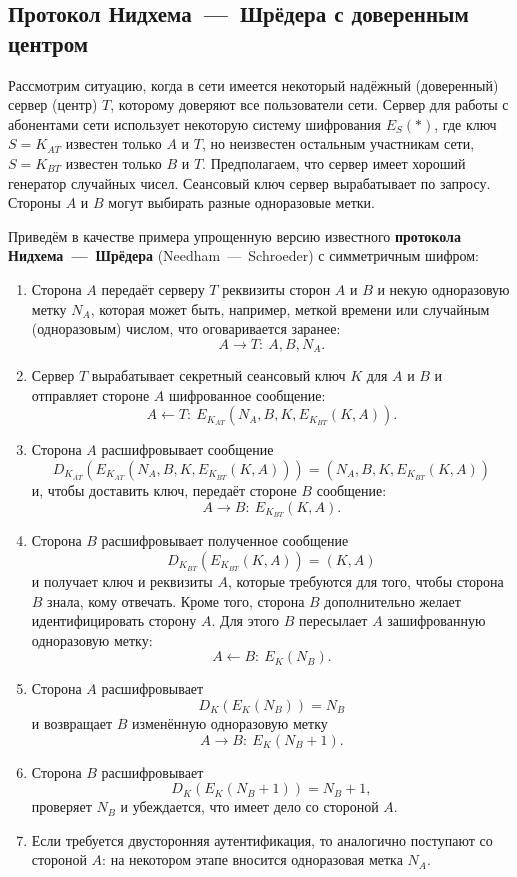 \subsection{Протокол Нидхема~---~Шрёдера с доверенным центром}

Рассмотрим ситуацию, когда в сети имеется некоторый надёжный (доверенный) сервер (центр) $T$, которому доверяют все пользователи сети. Сервер для работы с абонентами сети использует некоторую систему шифрования $E_S(*)$, где ключ $S=K_{AT}$ известен только $A$ и $T$, но неизвестен остальным участникам сети, $S = K_{BT}$ известен только $B$ и $T$. Предполагаем, что сервер имеет хороший генератор случайных чисел. Сеансовый ключ сервер вырабатывает по запросу. Стороны $A$ и $B$ могут выбирать разные одноразовые метки.

Приведём в качестве примера упрощенную версию известного \textbf{протокола Нидхема~---~Шрёдера} (Needham~---~Schroeder) с симметричным шифром:
\begin{enumerate}
    \item Сторона $A$ передаёт серверу $T$ реквизиты сторон $A$ и $B$ и некую одноразовую метку $N_A$, которая может быть, например, меткой времени или случайным (одноразовым) числом, что оговаривается заранее:
            \[ A \rightarrow T: ~ A, B, N_A. \]
    \item Сервер $T$ вырабатывает секретный сеансовый ключ $K$ для $A$ и $B$ и отправляет стороне $A$ шифрованное сообщение:
            \[ A \leftarrow T: ~ E_{K_{AT}}(N_A, B, K, E_{K_{BT}}(K, A)). \]
    \item Сторона $A$ расшифровывает сообщение
            \[ D_{K_{AT}}( E_{K_{AT}}(N_A, B, K, E_{K_{BT}}(K, A))) = (N_A, B, K, E_{K_{BT}}(K, A)) \]
        и, чтобы доставить ключ, передаёт стороне $B$ сообщение:
            \[ A \rightarrow B: ~ E_{K_{BT}}(K, A). \]
    \item Сторона $B$ расшифровывает полученное сообщение
            \[ D_{K_{BT}}( E_{K_{BT}}( K,A)) = (K,A) \]
        и получает ключ и реквизиты $A$, которые требуются для того, чтобы сторона $B$ знала, кому отвечать. Кроме того, сторона $B$ дополнительно желает идентифицировать сторону $A$. Для этого $B$ пересылает $A$ зашифрованную одноразовую метку:
            \[ A \leftarrow B: ~ E_{K}(N_B). \]
    \item Сторона $A$ расшифровывает
            \[ D_K( E_K( N_B)) = N_B \]
        и возвращает $B$ изменённую одноразовую метку
            \[ A \rightarrow B: ~ E_K(N_B + 1). \]
    \item Сторона $B$ расшифровывает
            \[ D_K( E_K( N_B + 1)) = N_B + 1, \]
        проверяет $N_B$ и убеждается, что имеет дело со стороной $A$.
    \item Если требуется двусторонняя аутентификация, то аналогично поступают со стороной $A$: на некотором этапе вносится одноразовая метка $N_A$.
\end{enumerate}
